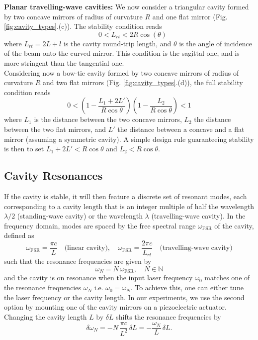 \noindent \textbf{Planar travelling-wave cavities:} We now consider a triangular cavity formed by two concave mirrors of radius of curvature $R$ and one flat mirror  (Fig. \ref{fig:cavity_types}.(c)). The stability condition reads
\begin{equation}
   \quad 0 < L_{rt} < 2R \cos(\theta)
\end{equation}
where $L_{rt} = 2L + l$ is the cavity round-trip length, and $\theta$ is the angle of incidence of the beam onto the curved mirror. This condition is the sagittal one, and is more stringent than the tangential one.\\

Considering now a bow-tie cavity formed by two concave mirrors of radius of curvature $R$ and two flat mirrors  (Fig. \ref{fig:cavity_types}.(d)), the full stability condition reads
\begin{equation}
  0 < \left( 1 - \frac{L_1 + 2L'}{R \cos\theta} \right) \left( 1 - \frac{L_2}{R \cos\theta} \right) < 1
\end{equation}
where $L_1$ is the distance between the two concave mirrors, $L_2$ the distance between the two flat mirrors, and $L'$ the distance between a concave and a flat mirror (assuming a symmetric cavity). A simple design rule guaranteeing stability is then to set $L_1 + 2L' < R \cos\theta$ and $L_2 < R \cos\theta$.\\


\subsection{Cavity Resonances}
If the cavity is stable, it will then feature a discrete set of resonant modes, each corresponding to a cavity length that is an integer multiple of half the wavelength $\lambda/2$ (standing-wave cavity) or the wavelength $\lambda$ (travelling-wave cavity). In the frequency domain, modes are spaced by the free spectral range $\omega_{\mathrm{FSR}}$ of the cavity, defined as
\begin{equation}
  \omega_{\mathrm{FSR}} = \frac{\pi c}{L} \quad \text{(linear cavity)}, \quad \omega_{\mathrm{FSR}} = \frac{2 \pi c}{L_{rt}} \quad \text{(travelling-wave cavity)}
\end{equation}
such that the resonance frequencies are given by
\begin{equation}
  \omega_N = N \, \omega_{\mathrm{FSR}}, \quad N \in \mathbb{N}
\end{equation}
and the cavity is on resonance when the input laser frequency $\omega_0$ matches one of the resonance frequencies $\omega_N$ i.e. $\omega_0 = \omega_N$. To achieve this, one can either tune the laser frequency or the cavity length. In our experiments, we use the second option by mounting one of the cavity mirrors on a piezoelectric actuator. Changing the cavity length $L$ by $\delta L$ shifts the resonance frequencies by
\begin{equation}
  \delta \omega_N = - N \, \frac{\pi c}{L^2} \, \delta L = - \frac{\omega_N}{L} \, \delta L. 
\end{equation}

